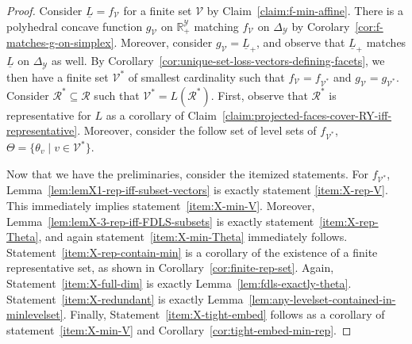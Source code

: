 \documentclass[11pt]{article}
\newcommand{\reals}{\mathbb{R}}
\newcommand{\simplex}{\Delta_\Y}
\newcommand{\R}{\mathcal{R}}
\newcommand{\V}{\mathcal{V}}
\newcommand{\Y}{\mathcal{Y}}
\newcommand{\risk}[1]{\underline{#1}}
\begin{document}
\lemmaX*
\begin{proof}
Consider $\risk L = f_\V$ for a finite set $\V$ by Claim~\ref{claim:f-min-affine}.
There is a polyhedral concave function $g_\V$ on $\reals^\Y_+$ matching $f_\V$ on $\simplex$ by Corolary~\ref{cor:f-matches-g-on-simplex}.
Moreover, consider $g_\V = \risk L_+$, and observe that $\risk L_+$ matches $\risk L$ on $\simplex$ as well.
By Corollary~\ref{cor:unique-set-loss-vectors-defining-facets}, we then have a finite set $\V^*$ of smallest cardinality such that $f_\V = f_{\V^*}$ and $g_\V = g_{\V^*}$.
Consider $\R^* \subseteq \R$ such that $\V^* = L(\R^*)$.
First, observe that $\R^*$ is representative for $L$ as a corollary of Claim~\ref{claim:projected-faces-cover-RY-iff-representative}.
Moreover, consider the follow set of level sets of $f_{\V^*}$, $\Theta = \{\theta_v \mid v \in \V^*\}$.

Now that we have the preliminaries, consider the itemized statements.
For $f_{\V^*}$, Lemma~\ref{lem:lemX1-rep-iff-subset-vectors} is exactly statement \eqref{item:X-rep-V}.
This immediately implies statement~\eqref{item:X-min-V}.
Moreover, Lemma~\ref{lem:lemX-3-rep-iff-FDLS-subsets} is exactly statement~\eqref{item:X-rep-Theta}, and again statement~\eqref{item:X-min-Theta} immediately follows.
Statement~\eqref{item:X-rep-contain-min} is a corollary of the existence of a finite representative set, as shown in Corollary~\ref{cor:finite-rep-set}.
Again, Statement~\eqref{item:X-full-dim} is exactly Lemma~\ref{lem:fdls-exactly-theta}.
Statement~\eqref{item:X-redundant} is exactly Lemma~\ref{lem:any-levelset-contained-in-minlevelset}.
Finally, Statement~\eqref{item:X-tight-embed} follows as a corollary of statement~\eqref{item:X-min-V} and Corollary~\ref{cor:tight-embed-min-rep}.
\end{proof}
\end{document}
